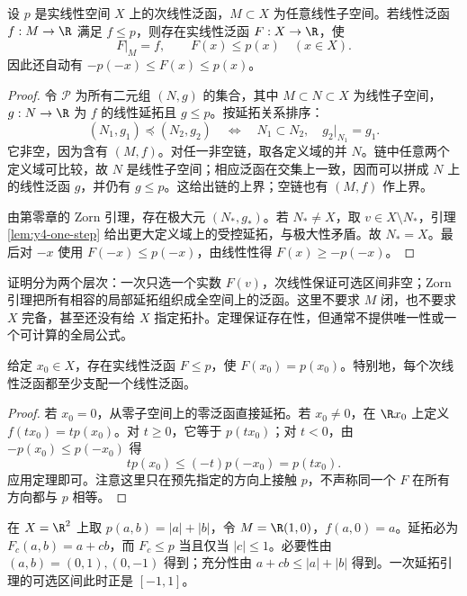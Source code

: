 \begin{theorem}\label{thm:y4-real-hahn-banach}
设 $p$ 是实线性空间 $X$ 上的次线性泛函，$M\subset X$ 为任意线性子空间。若线性泛函 $f:M\to\R$ 满足 $f\le p$，则存在实线性泛函 $F:X\to\R$，使
\[
 F|_M=f,\qquad F(x)\le p(x)\quad(x\in X).
\]
因此还自动有 $-p(-x)\le F(x)\le p(x)$。
\end{theorem}
\begin{proof}
令 $\mathcal P$ 为所有二元组 $(N,g)$ 的集合，其中 $M\subset N\subset X$ 为线性子空间，$g:N\to\R$ 为 $f$ 的线性延拓且 $g\le p$。按延拓关系排序：
\[
 (N_1,g_1)\preceq(N_2,g_2)
 \quad\Longleftrightarrow\quad
 N_1\subset N_2,\quad g_2|_{N_1}=g_1.
\]
它非空，因为含有 $(M,f)$。对任一非空链，取各定义域的并 $N$。链中任意两个定义域可比较，故 $N$ 是线性子空间；相应泛函在交集上一致，因而可以拼成 $N$ 上的线性泛函 $g$，并仍有 $g\le p$。这给出链的上界；空链也有 $(M,f)$ 作上界。

由第零章的 Zorn 引理，存在极大元 $(N_*,g_*)$。若 $N_*\ne X$，取 $v\in X\setminus N_*$，引理 \ref{lem:y4-one-step} 给出更大定义域上的受控延拓，与极大性矛盾。故 $N_*=X$。最后对 $-x$ 使用 $F(-x)\le p(-x)$，由线性性得 $F(x)\ge-p(-x)$。
\end{proof}

证明分为两个层次：一次只选一个实数 $F(v)$，次线性保证可选区间非空；Zorn 引理把所有相容的局部延拓组织成全空间上的泛函。这里不要求 $M$ 闭，也不要求 $X$ 完备，甚至还没有给 $X$ 指定拓扑。定理保证存在性，但通常不提供唯一性或一个可计算的全局公式。

\begin{corollary}[指定方向上的接触泛函]\label{cor:y4-supporting-functional}
给定 $x_0\in X$，存在实线性泛函 $F\le p$，使 $F(x_0)=p(x_0)$。特别地，每个次线性泛函都至少支配一个线性泛函。
\end{corollary}
\begin{proof}
若 $x_0=0$，从零子空间上的零泛函直接延拓。若 $x_0\ne0$，在 $\R x_0$ 上定义 $f(tx_0)=tp(x_0)$。对 $t\ge0$，它等于 $p(tx_0)$；对 $t<0$，由 $-p(x_0)\le p(-x_0)$ 得
\[
 tp(x_0)\le(-t)p(-x_0)=p(tx_0).
\]
应用定理即可。注意这里只在预先指定的方向上接触 $p$，不声称同一个 $F$ 在所有方向都与 $p$ 相等。
\end{proof}

\begin{example}[延拓可以有许多个]
在 $X=\R^2$ 上取 $p(a,b)=|a|+|b|$，令 $M=\R(1,0)$，$f(a,0)=a$。延拓必为 $F_c(a,b)=a+cb$，而 $F_c\le p$ 当且仅当 $|c|\le1$。必要性由 $(a,b)=(0,1),(0,-1)$ 得到；充分性由 $a+cb\le|a|+|b|$ 得到。一次延拓引理的可选区间此时正是 $[-1,1]$。
\end{example}

